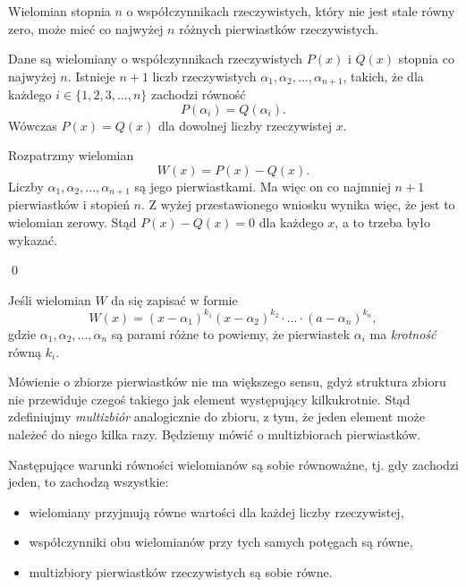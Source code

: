 \vspace{5px}


\noindent
Wielomian stopnia $n$ o współczynnikach rzeczywistych, który nie jest stale równy zero, może mieć co najwyżej $n$ różnych pierwiastków rzeczywistych.


\vspace{5px} 



\noindent
Dane są wielomiany o współczynnikach rzeczywistych $P(x)$ i $Q(x)$ stopnia co najwyżej $n$. Istnieje $n + 1$ liczb rzeczywistych $\alpha_1, \alpha_2, ..., \alpha_{n + 1}$, takich, że dla każdego $i \in \{1, 2, 3, ..., n\}$ zachodzi równość 
\[
    P(\alpha_i) = Q(\alpha_i).
\]
Wówczas $P(x) = Q(x)$ dla dowolnej liczby rzeczywistej $x$.

\vspace{5px}


\noindent
Rozpatrzmy wielomian 
\[
    W(x) = P(x) - Q(x).
\]
Liczby $\alpha_1, \alpha_2, ..., \alpha_{n + 1}$ są jego pierwiastkami. Ma więc on co najmniej $n + 1$ pierwiastków i stopień $n$. Z wyżej przestawionego wniosku wynika więc, że jest to wielomian zerowy. Stąd $P(x) - Q(x) = 0$ dla każdego $x$, a to trzeba było wykazać.

\qed


\noindent
Jeśli wielomian $W$ da się zapisać w formie
\[
    W(x) = (x - \alpha_1)^{k_1}(x - \alpha_2)^{k_2} \cdot ... \cdot (a - \alpha_n)^{k_n},
\]
gdzie $\alpha_1, \alpha_2, ..., \alpha_{n}$ są parami różne to powiemy, że pierwiastek $\alpha_i$ ma \textit{krotność} równą $k_i$. 

Mówienie o zbiorze pierwiastków nie ma większego sensu, gdyż struktura zbioru nie przewiduje czegoś takiego jak element występujący kilkukrotnie. Stąd zdefiniujmy \textit{multizbiór} analogicznie do zbioru, z tym, że jeden element może należeć do niego kilka razy. Będziemy mówić o multizbiorach pierwiastków.

\vspace{5px}


\noindent
Następujące warunki równości wielomianów są sobie równoważne, tj. gdy zachodzi jeden, to zachodzą wszystkie:
\begin{itemize}
    \item wielomiany przyjmują równe wartości dla każdej liczby rzeczywistej,
    \item współczynniki obu wielomianów przy tych samych potęgach są równe,
    \item multizbiory pierwiastków rzeczywistych są sobie równe.
\end{itemize}

